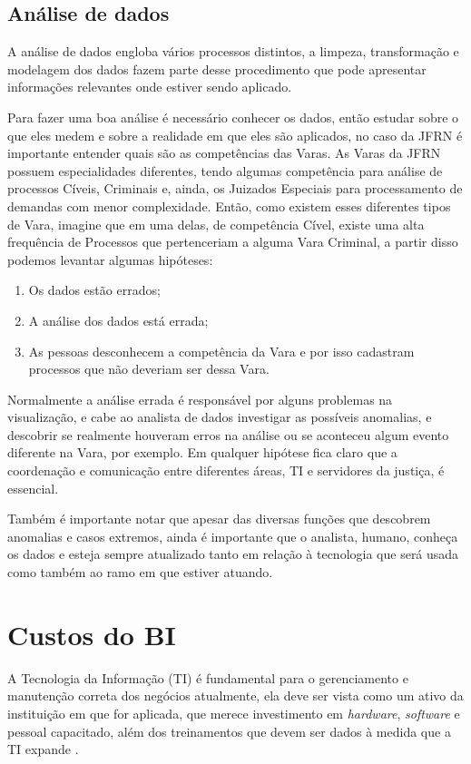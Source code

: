 \subsection{Análise de dados}

A análise de dados engloba vários processos distintos, a limpeza, transformação e modelagem dos dados fazem parte desse procedimento que pode apresentar informações relevantes onde estiver sendo aplicado. 

Para fazer uma boa análise é necessário conhecer os dados, então estudar sobre o que eles medem e sobre a realidade em que eles são aplicados, no caso da JFRN é importante entender quais são as competências das Varas. As Varas da JFRN possuem especialidades diferentes, tendo algumas competência para análise de processos Cíveis, Criminais e, ainda, os Juizados Especiais para processamento de demandas com menor complexidade. Então, como existem esses diferentes tipos de Vara, imagine que em uma delas, de competência Cível, existe uma alta frequência de Processos que pertenceriam a alguma Vara Criminal, a partir disso podemos levantar algumas hipóteses:
\begin{enumerate}
	\item Os dados estão errados;
	\item A análise dos dados está errada;
	\item As pessoas desconhecem a competência da Vara e por isso cadastram processos que não deveriam ser dessa Vara.
\end{enumerate}

Normalmente a análise errada é responsável por alguns problemas na visualização, e cabe ao analista de dados investigar as possíveis anomalias, e descobrir se realmente houveram erros na análise ou se aconteceu algum evento diferente na Vara, por exemplo. Em qualquer hipótese fica claro que a coordenação e comunicação entre diferentes áreas, TI e servidores da justiça, é essencial.

Também é importante notar que apesar das diversas funções que descobrem anomalias e casos extremos, ainda é importante que o analista, humano, conheça os dados e esteja sempre atualizado tanto em relação à tecnologia que será usada como também ao ramo em que estiver atuando.


\section{Custos do BI}

A Tecnologia da Informação (TI) é fundamental para o gerenciamento e manutenção correta dos negócios atualmente, ela deve ser vista como um ativo da instituição em que for aplicada, que merece investimento em \textit{hardware}, \textit{software} e pessoal capacitado, além dos treinamentos que devem ser dados à medida que a TI expande \cite{negash1}.

